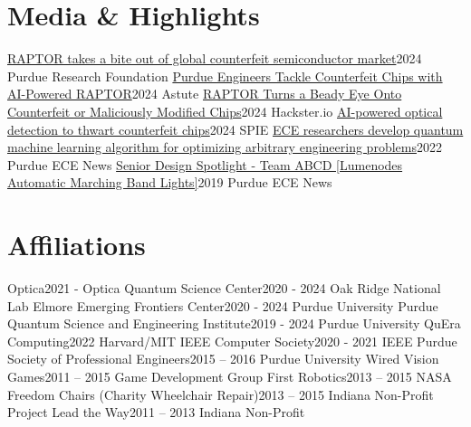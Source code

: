 \section{Media \& Highlights}
  \resumeSubHeadingListStart
    \resumeSubheading
      {\href{https://stories.prf.org/raptor-takes-a-bite-out-of-global-counterfeit-semiconductor-market/}{RAPTOR takes a bite out of global counterfeit semiconductor market}}{2024}
      {Purdue Research Foundation}{}
    \resumeSubheading
      {\href{https://www.astutegroup.com/news/industrial/purdue-engineers-tackle-counterfeit-chips-with-ai-powered-raptor/}{Purdue Engineers Tackle Counterfeit Chips with AI-Powered RAPTOR}}{2024}
      {Astute}{}
    \resumeSubheading
      {\href{https://www.hackster.io/news/raptor-turns-a-beady-eye-onto-counterfeit-or-maliciously-modified-chips-8924edf2b108}{RAPTOR Turns a Beady Eye Onto Counterfeit or Maliciously Modified Chips}}{2024}
      {Hackster.io}{}
    \resumeSubheading
      {\href{https://spie.org/news/ai-powered-optical-detection-to-thwart-counterfeit-chips}{AI-powered optical detection to thwart counterfeit chips}}{2024}
      {SPIE}{}
    \resumeSubheading
      {\href{https://engineering.purdue.edu/ECE/News/2022/ece-researchers-develop-quantum-machine-learning-algorithm-for-optimizing-arbitrary-engineering-problems}{ECE researchers develop quantum machine learning algorithm for optimizing arbitrary engineering problems}}{2022}
      {Purdue ECE News}{}
    \resumeSubheading
      {\href{https://engineering.purdue.edu/ECE/News/2019/senior-design-team-abcd}{Senior Design Spotlight - Team ABCD [Lumenodes Automatic Marching Band Lights]}}{2019}
      {Purdue ECE News}{}
  \resumeSubHeadingListEnd
\section{Affiliations}
  \resumeSubHeadingListStart
    \resumeSubheading
      {Optica}{2021 -}
      {Optica}{}
    \resumeSubheading
      {Quantum Science Center}{2020 - 2024}
      {Oak Ridge National Lab}{}
    \resumeSubheading
      {Elmore Emerging Frontiers Center}{2020 - 2024}
      {Purdue University}{}
    \resumeSubheading
      {Purdue Quantum Science and Engineering Institute}{2019 - 2024}
      {Purdue University}{}
    \resumeSubheading
      {QuEra Computing}{2022}
      {Harvard/MIT}{}
    \resumeSubheading
      {IEEE Computer Society}{2020 - 2021}
      {IEEE}{}
    \resumeSubheading
      {Purdue Society of Professional Engineers}{2015 – 2016}
      {Purdue University}{}
    \resumeSubheading
      {Wired Vision Games}{2011 – 2015}
      {Game Development Group}{}
    \resumeSubheading
      {First Robotics}{2013 – 2015}
      {NASA}{}
    \resumeSubheading
      {Freedom Chairs (Charity Wheelchair Repair)}{2013 – 2015}
      {Indiana Non-Profit}{}
    \resumeSubheading
      {Project Lead the Way}{2011 – 2013}
      {Indiana Non-Profit}{}
  \resumeSubHeadingListEnd
